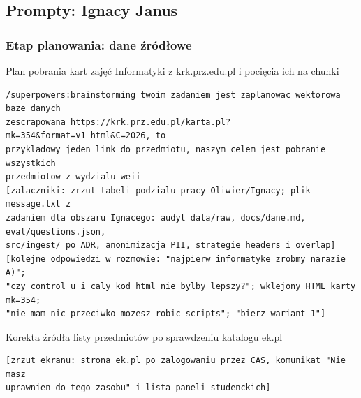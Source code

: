 \subsection{Prompty: Ignacy Janus}
\label{app:prompty-ignacy}

\subsubsection*{Etap planowania: dane źródłowe}

  {Plan pobrania kart zajęć Informatyki z krk.prz.edu.pl i pocięcia ich na chunki}
\begin{lstlisting}
/superpowers:brainstorming twoim zadaniem jest zaplanowac wektorowa baze danych
zescrapowana https://krk.prz.edu.pl/karta.pl?mk=354&format=v1_html&C=2026, to
przykladowy jeden link do przedmiotu, naszym celem jest pobranie wszystkich
przedmiotow z wydzialu weii
[zalaczniki: zrzut tabeli podzialu pracy Oliwier/Ignacy; plik message.txt z
zadaniem dla obszaru Ignacego: audyt data/raw, docs/dane.md, eval/questions.json,
src/ingest/ po ADR, anonimizacja PII, strategie headers i overlap]
[kolejne odpowiedzi w rozmowie: "najpierw informatyke zrobmy narazie A)";
"czy control u i caly kod html nie bylby lepszy?"; wklejony HTML karty mk=354;
"nie mam nic przeciwko mozesz robic scripts"; "bierz wariant 1"]
\end{lstlisting}

  {Korekta źródła listy przedmiotów po sprawdzeniu katalogu ek.pl}
\begin{lstlisting}
[zrzut ekranu: strona ek.pl po zalogowaniu przez CAS, komunikat "Nie masz
uprawnien do tego zasobu" i lista paneli studenckich]
\end{lstlisting}

